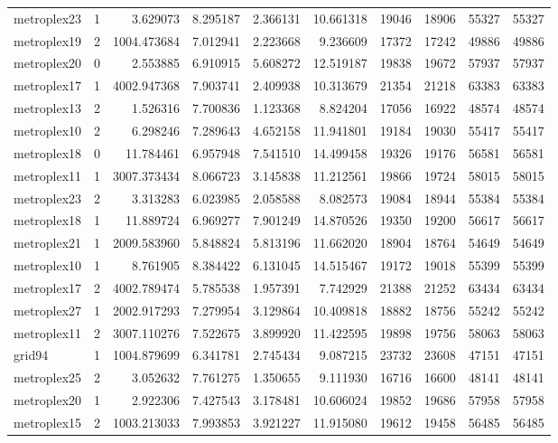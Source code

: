 \begin{longtable}{|l|r|r|r|r|r|r|r|r|r|}
metroplex23 & 1 & 3.629073 & 8.295187 & 2.366131 & 10.661318 & 19046 & 18906 & 55327 & 55327 \\
metroplex19 & 2 & 1004.473684 & 7.012941 & 2.223668 & 9.236609 & 17372 & 17242 & 49886 & 49886 \\
metroplex20 & 0 & 2.553885 & 6.910915 & 5.608272 & 12.519187 & 19838 & 19672 & 57937 & 57937 \\
metroplex17 & 1 & 4002.947368 & 7.903741 & 2.409938 & 10.313679 & 21354 & 21218 & 63383 & 63383 \\
metroplex13 & 2 & 1.526316 & 7.700836 & 1.123368 & 8.824204 & 17056 & 16922 & 48574 & 48574 \\
metroplex10 & 2 & 6.298246 & 7.289643 & 4.652158 & 11.941801 & 19184 & 19030 & 55417 & 55417 \\
metroplex18 & 0 & 11.784461 & 6.957948 & 7.541510 & 14.499458 & 19326 & 19176 & 56581 & 56581 \\
metroplex11 & 1 & 3007.373434 & 8.066723 & 3.145838 & 11.212561 & 19866 & 19724 & 58015 & 58015 \\
metroplex23 & 2 & 3.313283 & 6.023985 & 2.058588 & 8.082573 & 19084 & 18944 & 55384 & 55384 \\
metroplex18 & 1 & 11.889724 & 6.969277 & 7.901249 & 14.870526 & 19350 & 19200 & 56617 & 56617 \\
metroplex21 & 1 & 2009.583960 & 5.848824 & 5.813196 & 11.662020 & 18904 & 18764 & 54649 & 54649 \\
metroplex10 & 1 & 8.761905 & 8.384422 & 6.131045 & 14.515467 & 19172 & 19018 & 55399 & 55399 \\
metroplex17 & 2 & 4002.789474 & 5.785538 & 1.957391 & 7.742929 & 21388 & 21252 & 63434 & 63434 \\
metroplex27 & 1 & 2002.917293 & 7.279954 & 3.129864 & 10.409818 & 18882 & 18756 & 55242 & 55242 \\
metroplex11 & 2 & 3007.110276 & 7.522675 & 3.899920 & 11.422595 & 19898 & 19756 & 58063 & 58063 \\
grid94 & 1 & 1004.879699 & 6.341781 & 2.745434 & 9.087215 & 23732 & 23608 & 47151 & 47151 \\
metroplex25 & 2 & 3.052632 & 7.761275 & 1.350655 & 9.111930 & 16716 & 16600 & 48141 & 48141 \\
metroplex20 & 1 & 2.922306 & 7.427543 & 3.178481 & 10.606024 & 19852 & 19686 & 57958 & 57958 \\
metroplex15 & 2 & 1003.213033 & 7.993853 & 3.921227 & 11.915080 & 19612 & 19458 & 56485 & 56485 \\

\end{longtable}
